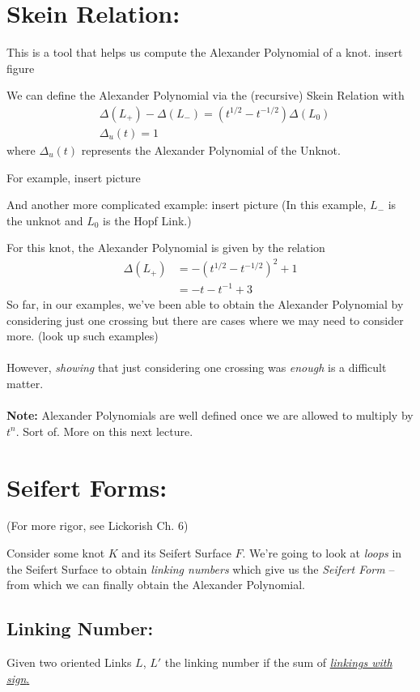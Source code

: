 \documentclass[twoside]{article}
\begin{document}
\section*{Skein Relation:}
This is a tool that helps us compute the Alexander Polynomial of a knot.
\vskip 0.5cm
insert figure
\vskip 0.5cm

We can define the Alexander Polynomial via the (recursive) Skein Relation with 
\begin{align*}
   &\Delta(L_{+}) - \Delta(L_{-}) = (t^{1/2} - t^{-1/2})\Delta(L_0) \\
   &\Delta_u(t) = 1
\end{align*}
where $\Delta_u(t)$ represents the Alexander Polynomial of the Unknot. 

For example,
\vskip 0.5cm
insert picture
\vskip 0.5cm

And another more complicated example:
\vskip 0.5cm
insert picture
\vskip 0.5cm
(In this example, $L_{-}$ is the unknot and $L_0$ is the Hopf Link.)

For this knot, the Alexander Polynomial is given by the relation
\begin{align*}
   \Delta(L_+) &= -(t^{1/2} - t^{-1/2})^2 + 1 \\
               &= -t - t^{-1} + 3
\end{align*}
So far, in our examples, we've been able to obtain the Alexander Polynomial by considering just one crossing but there are cases where we may need to consider more. (look up such examples)
\\
\\
However, \emph{showing} that just considering one crossing was \emph{enough} is a difficult matter.
\\
\\
\textbf{Note:} Alexander Polynomials are well defined once we are allowed to multiply by $t^n$. Sort of. More on this next lecture. 

\section*{Seifert Forms:}
(For more rigor, see Lickorish Ch. 6)

Consider some knot $K$ and its Seifert Surface $F$. We're going to look at \emph{loops} in the Seifert Surface to obtain \emph{linking numbers} which give us the \emph{Seifert Form} -- from which we can finally obtain the Alexander Polynomial.

\subsection*{Linking Number:}
Given two oriented Links $L$, $L'$ the linking number if the sum of \underline{\emph{linkings with sign}.}
\end{document}
